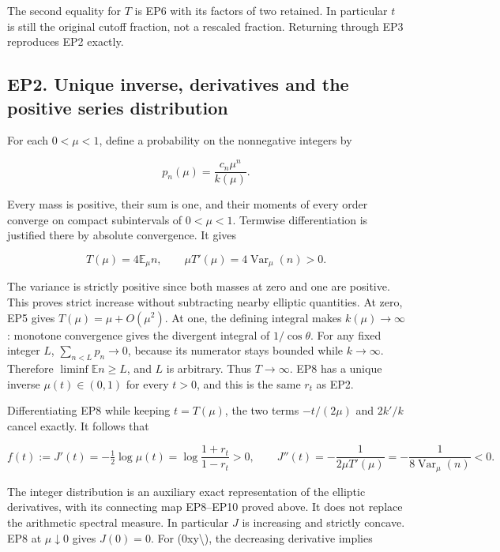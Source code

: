 \documentclass[10pt]{article}
\begin{document}
The second equality for \(T\) is EP6 with its factors of two retained. In particular \(t\) is still the original cutoff fraction, not a rescaled fraction. Returning through EP3 reproduces EP2 exactly.

\subsection{EP2. Unique inverse, derivatives and the positive series distribution}\label{ep2.-unique-inverse-derivatives-and-the-positive-series-distribution}

For each \(0<\mu<1\), define a probability on the nonnegative integers by

\[
 p_n(\mu)=\frac{c_n\mu^n}{k(\mu)}.
 \tag{EP9}
\]

Every mass is positive, their sum is one, and their moments of every order converge on compact subintervals of \(0<\mu<1\). Termwise differentiation is justified there by absolute convergence. It gives

\[
 T(\mu)=4\mathbb E_\mu n,\qquad
 \mu T'(\mu)=4\operatorname{Var}_\mu(n)>0.
 \tag{EP10}
\]

The variance is strictly positive since both masses at zero and one are positive. This proves strict increase without subtracting nearby elliptic quantities. At zero, EP5 gives \(T(\mu)=\mu+O(\mu^2)\). At one, the defining integral makes \(k(\mu)\to\infty\): monotone convergence gives the divergent integral of \(1/\cos\theta\). For any fixed integer \(L\), \(\sum_{n<L}p_n\to0\), because its numerator stays bounded while \(k\to\infty\). Therefore \(\liminf\mathbb E n\ge L\), and \(L\) is arbitrary. Thus \(T\to\infty\). EP8 has a unique inverse \(\mu(t)\in(0,1)\) for every \(t>0\), and this is the same \(r_t\) as EP2.

Differentiating EP8 while keeping \(t=T(\mu)\), the two terms \(-t/(2\mu)\) and \(2k'/k\) cancel exactly. It follows that

\[
 \boxed{f(t):=J'(t)=-\tfrac12\log\mu(t)
 =\log\frac{1+r_t}{1-r_t}>0,\qquad
 J''(t)=-\frac1{2\mu T'(\mu)}
       =-\frac1{8\operatorname{Var}_\mu(n)}<0.}
 \tag{EP11}
\]

The integer distribution is an auxiliary exact representation of the elliptic derivatives, with its connecting map EP8--EP10 proved above. It does not replace the arithmetic spectral measure. In particular \(J\) is increasing and strictly concave. EP8 at \(\mu\downarrow0\) gives \(J(0)=0\). For (0\le x\le y\textbackslash), the decreasing derivative implies
\end{document}
